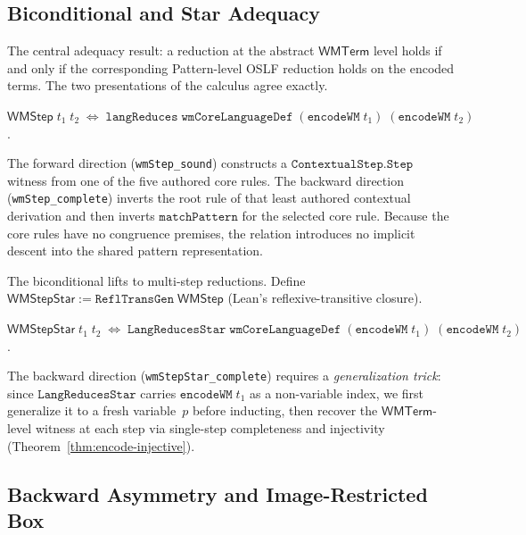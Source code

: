 \documentclass[11pt,openany]{report}
\begin{document}
\subsection{Biconditional and Star Adequacy}
\label{sec:wm-star-adequacy}

The central adequacy result: a reduction at the abstract $\mathsf{WMTerm}$
level holds if and only if the corresponding Pattern-level OSLF reduction
holds on the encoded terms.  The two presentations of the calculus agree
exactly.

\begin{theorem}
\label{thm:wmstep-iff}
$\mathsf{WMStep}\;t_1\;t_2 \;\Leftrightarrow\;
\mathtt{langReduces}\;\mathtt{wmCoreLanguageDef}\;
(\mathtt{encodeWM}\;t_1)\;(\mathtt{encodeWM}\;t_2)$.
\end{theorem}

\noindent
The forward direction (\texttt{wmStep\_sound}) constructs a
$\mathtt{ContextualStep.Step}$ witness from one of the five authored core
rules.  The backward direction (\texttt{wmStep\_complete}) inverts the root
rule of that least authored contextual derivation and then inverts
$\mathtt{matchPattern}$ for the selected core rule.  Because the core rules
have no congruence premises, the relation introduces no implicit descent into
the shared pattern representation.

The biconditional lifts to multi-step reductions.
Define $\mathsf{WMStepStar} := \mathtt{ReflTransGen}\;\mathsf{WMStep}$
(Lean's reflexive-transitive closure).

\begin{theorem}
\label{thm:star-adequate}
$\mathsf{WMStepStar}\;t_1\;t_2 \;\Leftrightarrow\;
\mathtt{LangReducesStar}\;\mathtt{wmCoreLanguageDef}\;
(\mathtt{encodeWM}\;t_1)\;(\mathtt{encodeWM}\;t_2)$.
\end{theorem}

\noindent
The backward direction (\texttt{wmStepStar\_complete}) requires a
\emph{generalization trick}: since $\mathtt{LangReducesStar}$ carries
$\mathtt{encodeWM}\;t_1$ as a non-variable index, we first generalize
it to a fresh variable~$p$ before inducting, then recover the
$\mathsf{WMTerm}$-level witness at each step via single-step
completeness and injectivity (Theorem~\ref{thm:encode-injective}).

\subsection{Backward Asymmetry and Image-Restricted Box}
\label{sec:wm-backward-asymmetry}
\label{sec:wm-image-box}
\end{document}
